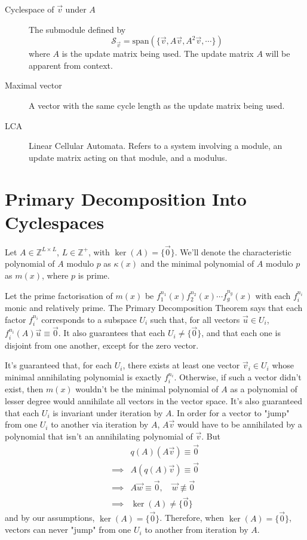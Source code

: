 \documentclass[a4paper, reqno, 12pt]{amsart}
\newcommand\cycsp[1]{\mathcal{S}_{#1}}
\begin{document}
\begin{description}
			\item[Cyclespace of $\vec{v}$ under $A$] The submodule defined by 
			\[
				\cycsp{\vec{v}} = \text{span}(\{\vec{v}, A\vec{v}, A^{2}\vec{v}, \cdots\})
			\]
			where $A$ is the update matrix being used. The update matrix $A$ will be apparent from context.
			
			\item[Maximal vector] A vector with the same cycle length as the update matrix being used.
			
			\item[LCA] Linear Cellular Automata. Refers to a system involving a module, an update matrix acting on that module, and a modulus.
		\end{description}
		
	\section{Primary Decomposition Into Cyclespaces}
		Let $A \in \mathds{Z}^{L \times L}$, $L \in \mathds{Z}^{+}$, with $\ker(A) = \{\vec{0}\}$. We'll denote the characteristic
		polynomial of $A$ modulo $p$ as $\kappa(x)$ and the minimal polynomial of $A$ modulo $p$ as $m(x)$, where $p$ is prime.
		
		Let the prime factorisation of $m(x)$ be $f_{1}^{n_{1}}(x)f_{2}^{n_{2}}(x)\cdots f_{g}^{n_{g}}(x)$ with each $f_i^{n_i}$ monic and relatively prime. 
		The Primary Decomposition Theorem says that each factor $f_i^{n_i}$ corresponds to a subspace $U_i$ such that, for all vectors $\vec{u} \in U_i$,
		$f_i^{n_i}(A)\vec{u} \equiv \vec{0}$. It also guarantees that each $U_i \neq \{\vec{0}\}$, and that each one is disjoint from one another, except for the 
		zero vector.
		
		It's guaranteed that, for each $U_i$, there exists at least one vector $\vec{v}_i \in U_i$ whose minimal annihilating polynomial is exactly $f_i^{n_i}$.
		Otherwise, if such a vector didn't exist, then $m(x)$ wouldn't be the minimal polynomial of $A$ as a polynomial of lesser degree would annihilate all
		vectors in the vector space. It's also guaranteed that each $U_i$ is invariant under iteration by $A$. In order for a vector to "jump" from one $U_i$
		to another via iteration by $A$, $A\vec{v}$ would have to be annihilated by a polynomial that isn't an annihilating polynomial of $\vec{v}$. But
		\begin{align*}
			         & q(A)(A\vec{v}) \equiv \vec{0}                             \\
			\implies & A(q(A)\vec{v}) \equiv \vec{0}                             \\
			\implies & A\vec{w} \equiv \vec{0}, \quad \vec{w} \not\equiv \vec{0} \\
			\implies & \ker(A) \neq \{\vec{0}\}
		\end{align*}
		and by our assumptions, $\ker(A) = \{\vec{0}\}$. Therefore, when $\ker(A) = \{\vec{0}\}$, vectors can never "jump" from one $U_i$ to another from 
		iteration by $A$.
		
\end{document}
